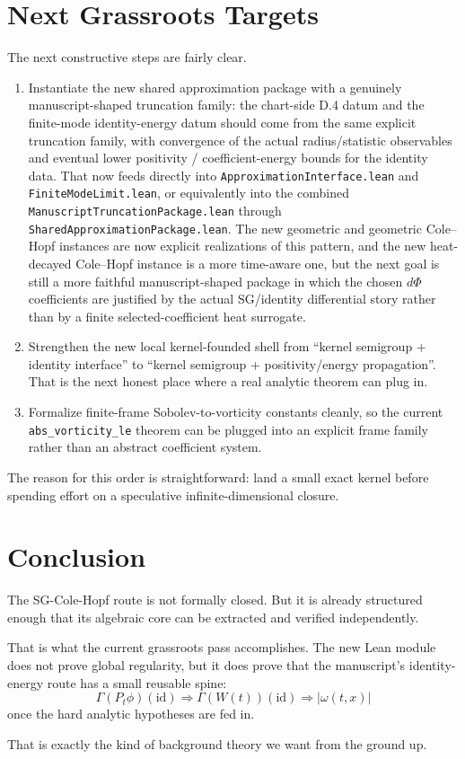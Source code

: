 \documentclass[11pt]{article}
\theoremstyle{remark}
\begin{document}
\section{Next Grassroots Targets}

The next constructive steps are fairly clear.

\begin{enumerate}[leftmargin=1.5em]
  \item Instantiate the new shared approximation package with a genuinely
  manuscript-shaped truncation family: the chart-side D.4 datum and the
  finite-mode identity-energy datum should come from the same explicit
  truncation family, with convergence of the actual radius/statistic
  observables and eventual lower positivity / coefficient-energy bounds for the
  identity data.  That now feeds directly into
  \texttt{ApproximationInterface.lean} and
  \texttt{FiniteModeLimit.lean}, or equivalently into the combined
  \texttt{ManuscriptTruncationPackage.lean} through
  \texttt{SharedApproximationPackage.lean}.  The new geometric and geometric
  Cole--Hopf instances are now explicit realizations of this pattern, and the
  new heat-decayed Cole--Hopf instance is a more time-aware one, but the next
  goal is still a more faithful manuscript-shaped package in which the chosen
  \(d\Phi\) coefficients are justified by the actual SG/identity differential
  story rather than by a finite selected-coefficient heat surrogate.
  \item Strengthen the new local kernel-founded shell from ``kernel semigroup +
  identity interface'' to ``kernel semigroup + positivity/energy propagation''.
  That is the next honest place where a real analytic theorem can plug in.
  \item Formalize finite-frame Sobolev-to-vorticity constants cleanly, so the
  current \texttt{abs\_vorticity\_le} theorem can be plugged into an explicit
  frame family rather than an abstract coefficient system.
\end{enumerate}

The reason for this order is straightforward: land a small exact kernel before
spending effort on a speculative infinite-dimensional closure.

\section{Conclusion}

The SG-Cole-Hopf route is not formally closed.  But it is already structured
enough that its algebraic core can be extracted and verified independently.

That is what the current grassroots pass accomplishes.  The new Lean module does
not prove global regularity, but it does prove that the manuscript's
identity-energy route has a small reusable spine:
\[
  \Gamma(P_t \phi)(\mathrm{id})
  \Longrightarrow
  \Gamma(W(t))(\mathrm{id})
  \Longrightarrow
  |\omega(t,x)|
\]
once the hard analytic hypotheses are fed in.

That is exactly the kind of background theory we want from the ground up.
\end{document}
